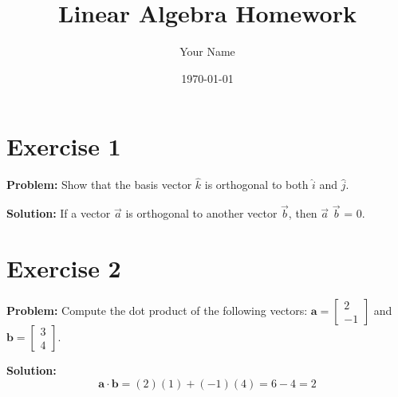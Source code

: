 \documentclass{article}
\begin{document}
\title{Linear Algebra Homework}
\author{Your Name}
\date{\today}
\maketitle

\section*{Exercise 1}

\textbf{Problem:} Show that the basis vector $\hat{k}$  is orthogonal to both $\hat{i}$ and $\hat{j}$.

\textbf{Solution:} If a vector $\vec{a}$ is orthogonal to another vector $\vec{b}$, then $\vec{a}$ \cdot $\vec{b}$ = 0.

\section*{Exercise 2}

\textbf{Problem:} Compute the dot product of the following vectors: $\mathbf{a} = \begin{bmatrix} 2 \\ -1 \end{bmatrix}$ and $\mathbf{b} = \begin{bmatrix} 3 \\ 4 \end{bmatrix}$.

\textbf{Solution:}
\[
\mathbf{a} \cdot \mathbf{b} = (2)(1) + (-1)(4) = 6 - 4 = 2
\]
\end{document}
